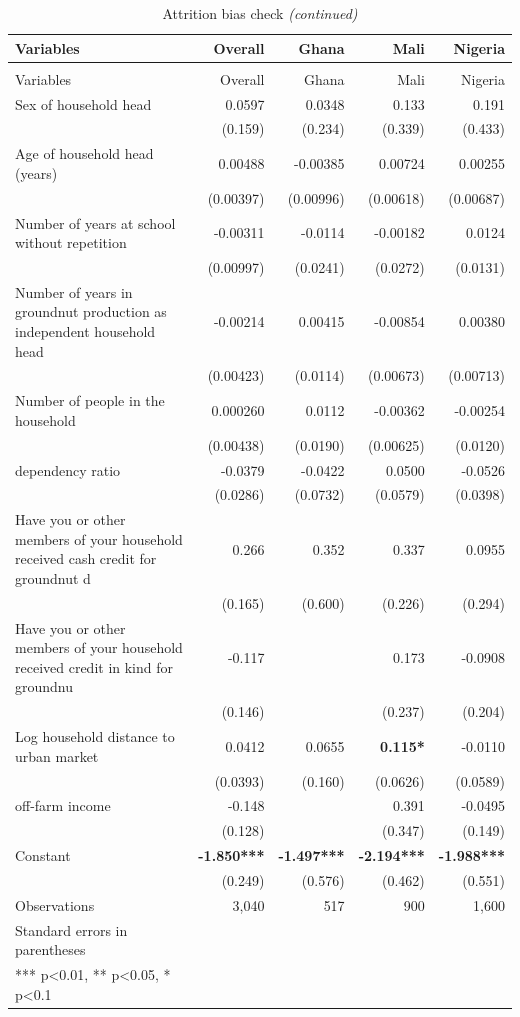 \documentclass[
]{article}
\begin{document}
\begin{longtable}[t]{lrrrr}
\caption{\label{tab:unnamed-chunk-10}Attrition bias check}\\
\toprule
Variables & Overall & Ghana & Mali & Nigeria\\
\midrule
\endfirsthead
\caption[]{\label{tab:unnamed-chunk-10}Attrition bias check \textit{(continued)}}\\
\toprule
Variables & Overall & Ghana & Mali & Nigeria\\
\midrule
\endhead

\endfoot
\bottomrule
\endlastfoot
Sex of household head & 0.0597 & 0.0348 & 0.133 & 0.191\\
 & (0.159) & (0.234) & (0.339) & (0.433)\\
Age of household head (years) & 0.00488 & -0.00385 & 0.00724 & 0.00255\\
 & (0.00397) & (0.00996) & (0.00618) & (0.00687)\\
Number of years at school without repetition & -0.00311 & -0.0114 & -0.00182 & 0.0124\\
 & (0.00997) & (0.0241) & (0.0272) & (0.0131)\\
Number of years in groundnut production as independent household head & -0.00214 & 0.00415 & -0.00854 & 0.00380\\
 & (0.00423) & (0.0114) & (0.00673) & (0.00713)\\
Number of people in the household & 0.000260 & 0.0112 & -0.00362 & -0.00254\\
 & (0.00438) & (0.0190) & (0.00625) & (0.0120)\\
dependency ratio & -0.0379 & -0.0422 & 0.0500 & -0.0526\\
 & (0.0286) & (0.0732) & (0.0579) & (0.0398)\\
Have you or other members of your household received cash credit for groundnut d & 0.266 & 0.352 & 0.337 & 0.0955\\
 & (0.165) & (0.600) & (0.226) & (0.294)\\
Have you or other members of your household received credit in kind for groundnu & -0.117 &  & 0.173 & -0.0908\\
 & (0.146) &  & (0.237) & (0.204)\\
Log household distance to urban market & 0.0412 & 0.0655 & \textbf{0.115*} & -0.0110\\
 & (0.0393) & (0.160) & (0.0626) & (0.0589)\\
off-farm income & -0.148 &  & 0.391 & -0.0495\\
 & (0.128) &  & (0.347) & (0.149)\\
Constant & \textbf{-1.850***} & \textbf{-1.497***} & \textbf{-2.194***} & \textbf{-1.988***}\\
 & (0.249) & (0.576) & (0.462) & (0.551)\\
Observations & 3,040 & 517 & 900 & 1,600\\
Standard errors in parentheses &  &  &  & \\
*** p<0.01, ** p<0.05, * p<0.1 &  &  &  & \\*
\end{longtable}
\endgroup{}
\end{document}
